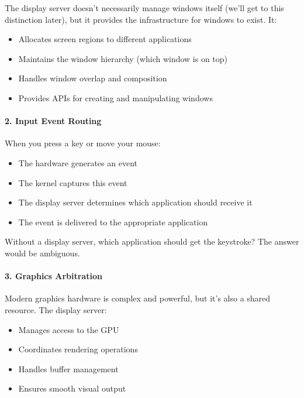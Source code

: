 The display server doesn't necessarily manage windows itself (we'll get to this distinction later), but it provides the infrastructure for windows to exist. It:

\begin{itemize}[leftmargin=*]
    \item Allocates screen regions to different applications
    \item Maintains the window hierarchy (which window is on top)
    \item Handles window overlap and composition
    \item Provides APIs for creating and manipulating windows
\end{itemize}

\paragraph{2. Input Event Routing}

When you press a key or move your mouse:

\begin{itemize}[leftmargin=*]
    \item The hardware generates an event
    \item The kernel captures this event
    \item The display server determines which application should receive it
    \item The event is delivered to the appropriate application
\end{itemize}

Without a display server, which application should get the keystroke? The answer would be ambiguous.

\paragraph{3. Graphics Arbitration}

Modern graphics hardware is complex and powerful, but it's also a shared resource. The display server:

\begin{itemize}[leftmargin=*]
    \item Manages access to the GPU
    \item Coordinates rendering operations
    \item Handles buffer management
    \item Ensures smooth visual output
\end{itemize}

